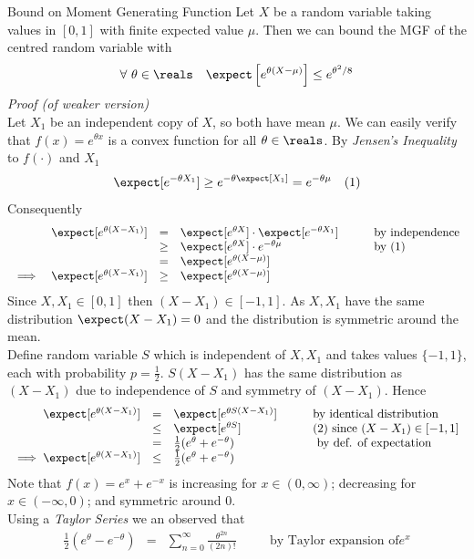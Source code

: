 \documentclass[11pt,a4paper]{article}
\begin{document}
  \begin{theorem}{Bound on Moment Generating Function}
    Let $X$ be a random variable taking values in $[0,1]$ with finite expected value $\mu$. Then we can bound the MGF of the centred random variable with
    \[ \forall\ \theta\in\reals\quad\expect\left[e^{\theta(X-\mu)}\right]\leq e^{\theta^2/8} \]
    \textit{Proof (of weaker version)}\\
    Let $X_1$ be an independent copy of $X$, so both have mean $\mu$. We can easily verify that $f(x)=e^{\theta x}$ is a convex function for all $\theta\in\reals$. By \textit{Jensen's Inequality} to $f(\cdot)$ and $X_1$
    \[ \expect[e^{-\theta X_1}]\geq e^{-\theta\expect[X_1]}=e^{-\theta\mu}\quad(1) \]
    Consequently
    \[\begin{array}{rrclll}
    &\expect[e^{\theta(X-X_1)}]&=&\expect[e^{\theta X}]\cdot\expect[e^{-\theta X_1}]&\quad&\text{by independence}\\
    &&\geq&\expect[e^{\theta X}]\cdot e^{-\theta\mu}&&\text{by (1)}\\
    &&=&\expect[e^{\theta(X-\mu)}]\\
    \implies&\expect[e^{\theta(X-X_1)}]&\geq&\expect[e^{\theta(X-\mu)}]
    \end{array}\]
    Since $X,X_1\in[0,1]$ then $(X-X_1)\in[-1,1]$. As $X,X_1$ have the same distribution $\expect(X-X_1)=0$ and the distribution is symmetric around the mean.\\
    Define random variable $S$ which is independent of $X,X_1$ and takes values $\{-1,1\}$, each with probability $p=\frac12$. $S(X-X_1)$ has the same distribution as $(X-X_1)$ due to independence of $S$ and symmetry of $(X-X_1)$. Hence
    \[\begin{array}{rclll}
      \expect[e^{\theta(X-X_1)}]&=&\expect[e^{\theta S(X-X_1)}]&\quad&\text{by identical distribution}\\
      &\leq&\expect[e^{\theta S}]&&(2)\text{ since }(X-X_1)\in[-1,1]\\
      &=&\frac12(e^\theta+e^{-\theta})&&\text{ by def. of expectation}\\
      \implies\expect[e^{\theta(X-X_1)}]&\leq&\frac12(e^\theta+e^{-\theta})
    \end{array}\]
    Note that $f(x)=e^x+e^{-x}$ is increasing for $x\in(0,\infty)$; decreasing for $x\in(-\infty,0)$; and symmetric around $0$.\\
    Using a \textit{Taylor Series} we an observed that
    \[\begin{array}{rclll}
    \frac12(e^\theta-e^{-\theta})&=&{\displaystyle\sum_{n=0}^\infty}\frac{\theta^{2n}}{(2n)!}&\quad&\text{by Taylor expansion of}e^x\\

\end{array}\]
\end{theorem}
\end{document}
